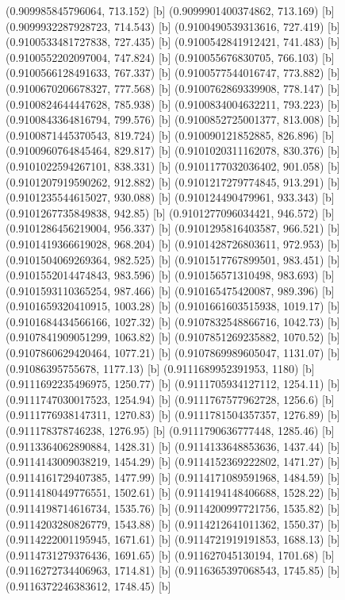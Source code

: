 {{{(0.909985845796064, 713.152) [b] 
(0.9099901400374862, 713.169) [b] 
(0.9099932287928723, 714.543) [b] 
(0.9100490539313616, 727.419) [b] 
(0.9100533481727838, 727.435) [b] 
(0.9100542841912421, 741.483) [b] 
(0.9100552202097004, 747.824) [b] 
(0.910055676830705, 766.103) [b] 
(0.9100566128491633, 767.337) [b] 
(0.9100577544016747, 773.882) [b] 
(0.9100670206678327, 777.568) [b] 
(0.9100762869339908, 778.147) [b] 
(0.9100824644447628, 785.938) [b] 
(0.9100834004632211, 793.223) [b] 
(0.9100843364816794, 799.576) [b] 
(0.9100852725001377, 813.008) [b] 
(0.9100871445370543, 819.724) [b] 
(0.910090121852885, 826.896) [b] 
(0.9100960764845464, 829.817) [b] 
(0.9101020311162078, 830.376) [b] 
(0.9101022594267101, 838.331) [b] 
(0.9101177032036402, 901.058) [b] 
(0.9101207919590262, 912.882) [b] 
(0.9101217279774845, 913.291) [b] 
(0.9101235544615027, 930.088) [b] 
(0.910124490479961, 933.343) [b] 
(0.9101267735849838, 942.85) [b] 
(0.9101277096034421, 946.572) [b] 
(0.9101286456219004, 956.337) [b] 
(0.9101295816403587, 966.521) [b] 
(0.9101419366619028, 968.204) [b] 
(0.9101428726803611, 972.953) [b] 
(0.9101504069269364, 982.525) [b] 
(0.9101517767899501, 983.451) [b] 
(0.9101552014474843, 983.596) [b] 
(0.910156571310498, 983.693) [b] 
(0.9101593110365254, 987.466) [b] 
(0.910165475420087, 989.396) [b] 
(0.9101659320410915, 1003.28) [b] 
(0.9101661603515938, 1019.17) [b] 
(0.9101684434566166, 1027.32) [b] 
(0.9107832548866716, 1042.73) [b] 
(0.9107841909051299, 1063.82) [b] 
(0.9107851269235882, 1070.52) [b] 
(0.9107860629420464, 1077.21) [b] 
(0.9107869989605047, 1131.07) [b] 
(0.91086395755678, 1177.13) [b] 
(0.9111689952391953, 1180) [b] 
(0.9111692235496975, 1250.77) [b] 
(0.9111705934127112, 1254.11) [b] 
(0.9111747030017523, 1254.94) [b] 
(0.9111767577962728, 1256.6) [b] 
(0.9111776938147311, 1270.83) [b] 
(0.9111781504357357, 1276.89) [b] 
(0.911178378746238, 1276.95) [b] 
(0.9111790636777448, 1285.46) [b] 
(0.9113364062890884, 1428.31) [b] 
(0.9114133648853636, 1437.44) [b] 
(0.9114143009038219, 1454.29) [b] 
(0.9114152369222802, 1471.27) [b] 
(0.9114161729407385, 1477.99) [b] 
(0.9114171089591968, 1484.59) [b] 
(0.9114180449776551, 1502.61) [b] 
(0.9114194148406688, 1528.22) [b] 
(0.9114198714616734, 1535.76) [b] 
(0.9114200997721756, 1535.82) [b] 
(0.9114203280826779, 1543.88) [b] 
(0.9114212641011362, 1550.37) [b] 
(0.9114222001195945, 1671.61) [b] 
(0.9114721919191853, 1688.13) [b] 
(0.9114731279376436, 1691.65) [b] 
(0.911627045130194, 1701.68) [b] 
(0.9116272734406963, 1714.81) [b] 
(0.9116365397068543, 1745.85) [b] 
(0.9116372246383612, 1748.45) [b] 
}}}
